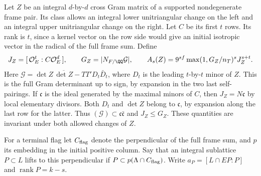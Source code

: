 \documentclass[a4paper,11pt]{article}
\theoremstyle{definition}
\theoremstyle{remark}
\numberwithin{equation}{section}
\newcommand{\OO}{\mathcal O}
\begin{document}
Let \(Z\) be an integral \(d\)-by-\(d\) cross Gram matrix
of a supported nondegenerate frame pair. Its class allows
an integral lower unitriangular change on the left and an
integral upper unitriangular change on the right. Let \(C\)
be its first \(t\) rows. Its rank is \(t\), since a kernel
vector on the row side would give an initial isotropic
vector in the radical of the full frame sum. Define
\[
  J_Z=[\,\OO_E^t:C\OO_E^d\,],\qquad
  G_Z=|N_{F/\QQ}\mathcal G|,\qquad
  A_s(Z)=9^{sf}\max(1,G_Z/n_T)^s J_Z^{s+t}.
\]
Here \(\mathcal G=\det Z\,\overline{\det Z}
-TT'D_t\bar D_t\), where \(D_t\) is the leading
\(t\)-by-\(t\) minor of \(Z\). This is the full Gram
determinant up to sign, by expansion in the two last
self-pairings. If \(\mathfrak c\) is the ideal generated by
the maximal minors of \(C\), then \(J_Z=N\mathfrak c\)
by local elementary divisors. Both \(D_t\) and \(\det Z\)
belong to \(\mathfrak c\), by expansion along the last row
for the latter. Thus \((\mathcal G)\subset\mathfrak c\bar{\mathfrak c}\)
and \(J_Z\le G_Z\). These quantities are invariant under
both allowed changes of \(Z\).

For a terminal flag let \(C_{\rm flag}\) denote the
perpendicular of the full frame sum, and \(p\) its embedding
in the initial positive column. Say that an integral
sublattice \(P\subset L\) lifts to this perpendicular if
\(P\subset p(\Lambda\cap C_{\rm flag})\). Write
\(a_P=[L\cap EP:P]\) and \(\operatorname{rank}P=k-s\).
\end{document}
